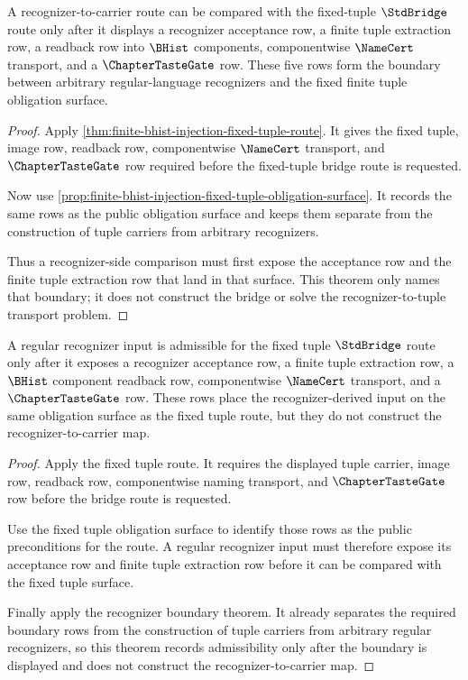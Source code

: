 \begin{theorem}
\label{thm:finite-bhist-injection-recognizer-boundary}
A recognizer-to-carrier route can be compared with the fixed-tuple
$\StdBridge$ route only after it displays a recognizer acceptance row, a finite
tuple extraction row, a readback row into $\BHist$ components, componentwise
$\NameCert$ transport, and a $\ChapterTasteGate$ row. These five rows form the
boundary between arbitrary regular-language recognizers and the fixed finite
tuple obligation surface.
\end{theorem}
\begin{proof}
Apply \autoref{thm:finite-bhist-injection-fixed-tuple-route}. It gives the
fixed tuple, image row, readback row, componentwise $\NameCert$ transport, and
$\ChapterTasteGate$ row required before the fixed-tuple bridge route is
requested.

Now use \autoref{prop:finite-bhist-injection-fixed-tuple-obligation-surface}.
It records the same rows as the public obligation surface and keeps them
separate from the construction of tuple carriers from arbitrary recognizers.

Thus a recognizer-side comparison must first expose the acceptance row and the
finite tuple extraction row that land in that surface. This theorem only names
that boundary; it does not construct the bridge or solve the recognizer-to-tuple
transport problem.
\end{proof}

\begin{theorem}
\label{thm:finite-bhist-injection-regular-recognizer-weakening}
A regular recognizer input is admissible for the fixed tuple $\StdBridge$ route only after it exposes a recognizer acceptance row, a finite tuple extraction row, a $\BHist$ component readback row, componentwise $\NameCert$ transport, and a $\ChapterTasteGate$ row. These rows place the recognizer-derived input on the same obligation surface as the fixed tuple route, but they do not construct the recognizer-to-carrier map.
\end{theorem}
\begin{proof}
Apply the fixed tuple route. It requires the displayed tuple carrier, image row, readback row, componentwise naming transport, and $\ChapterTasteGate$ row before the bridge route is requested.

Use the fixed tuple obligation surface to identify those rows as the public preconditions for the route. A regular recognizer input must therefore expose its acceptance row and finite tuple extraction row before it can be compared with the fixed tuple surface.

Finally apply the recognizer boundary theorem. It already separates the required boundary rows from the construction of tuple carriers from arbitrary regular recognizers, so this theorem records admissibility only after the boundary is displayed and does not construct the recognizer-to-carrier map.
\end{proof}

